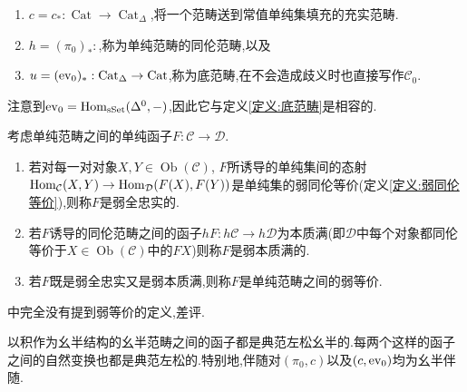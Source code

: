 \begin{definition}
    \begin{enumerate}
        \item $c= c_* : \operatorname{Cat} \to \operatorname{Cat}_{\Delta}$,将一个范畴送到常值单纯集填充的充实范畴.
        \item $h = (\pi_0)_*:$,称为单纯范畴的同伦范畴,以及
        \item $u = (\operatorname{ev}_0)_*:\operatorname{Cat}_{\Delta} \to \operatorname{Cat}$,称为底范畴,在不会造成歧义时也直接写作$\mathcal{C}_0$.
    \end{enumerate}
    注意到$\operatorname{ev}_0 = \operatorname{Hom}_{\operatorname{sSet}}(\Delta^0,-)$,因此它与定义\ref{定义:底范畴}是相容的.
\end{definition}

\begin{definition}
    考虑单纯范畴之间的单纯函子$F:\mathcal{C}\to\mathcal{D}$.
    \begin{enumerate}
        \item 若对每一对对象$X,Y\in \operatorname{Ob}(\mathcal{C})$, $F$所诱导的单纯集间的态射$\operatorname{Hom}_{\mathcal{C}}(X,Y)\to \operatorname{Hom}_{\mathcal{D}}(F(X),F(Y))$是单纯集的弱同伦等价(定义\ref{定义:弱同伦等价}),则称$F$是弱全忠实的.
        \item 若$F$诱导的同伦范畴之间的函子$hF : h\mathcal{C}\to h\mathcal{D}$为本质满(即$\mathcal{D}$中每个对象都同伦等价于$X\in \operatorname{Ob}(\mathcal{C})$中的$FX$)则称$F$是弱本质满的.
        \item 若$F$既是弱全忠实又是弱本质满,则称$F$是单纯范畴之间的弱等价.
    \end{enumerate}
\end{definition}
\begin{remark}
    \cite{Land}中完全没有提到弱等价的定义,差评.
\end{remark}
\begin{lemma}
    以积作为幺半结构的幺半范畴之间的函子都是典范左松幺半的.每两个这样的函子之间的自然变换也都是典范左松的.特别地,伴随对$(\pi_0,c)$以及$(c,\operatorname{ev}_0)$均为幺半伴随.
\end{lemma}

